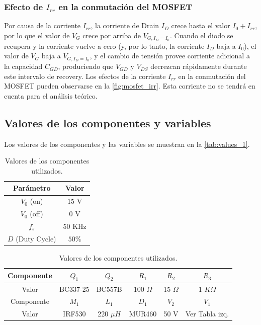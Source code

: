 \documentclass[e4_tp1_main.tex]{subfiles}
\begin{document}
\subsubsection{Efecto de $I_{rr}$ en la conmutación del MOSFET}
\label{subsubsec:irr_effect}
Por causa de la corriente $I_{rr}$, la corriente de Drain $I_D$ crece hasta el valor $I_0+I_{rr}$, por lo que el valor de $V_{G}$ crece por arriba de $V_{G,I_D=I_0}$. Cuando el diodo se recupera y la corriente vuelve a cero (y, por lo tanto, la corriente $I_D$ baja a $I_0$), el valor de $V_G$ baja a $V_{G,I_D=I_0}$, y el cambio de tensión provee corriente adicional a la capacidad $C_{GD}$, produciendo que $V_{GD}$ y $V_{DS}$ decrezcan rápidamente durante este intervalo de recovery. Los efectos de la corriente $I_{rr}$ en la conmutación del MOSFET pueden observarse en la \autoref{fig:mosfet_irr}. Esta corriente no se tendrá en cuenta para el análisis teórico.

\subsection{Valores de los componentes y variables}

Los valores de los componentes y las variables se muestran en la \autoref{tab:values_1}.

\begin{table}[H]
\centering
\begin{tabular}{|c|c|}
\hline
Parámetro & Valor \\
\hline
$V_0$ (on) & $15$ V \\
\hline
$V_0$ (off) & $0$ V \\
\hline
$f_s$ & $50$ KHz \\
\hline
$D$ (Duty Cycle) & $50\%$ \\
\hline
\end{tabular}
\hspace{0.02\textwidth}
\begin{tabular}{|c|c|c|c|c|c|}
\hline
Componente & $Q_1$ & $Q_2$ & $R_1$ & $R_2$ & $R_3$ \\
\hline
Valor & BC337-25 & BC557B & 100 $\Omega$ & 15 $\Omega$ & 1 $K\Omega$ \\
\hline
Componente & $M_1$ & $L_1$ & $D_1$ & $V_2$ & $V_1$\\
\hline
Valor & IRF530 & 220 $\mu H$ & MUR460 & 50 V & Ver Tabla izq.\\
\hline
\end{tabular}
\caption{Valores de los componentes utilizados.}
\label{tab:values_1}
\end{table}
\end{document}
